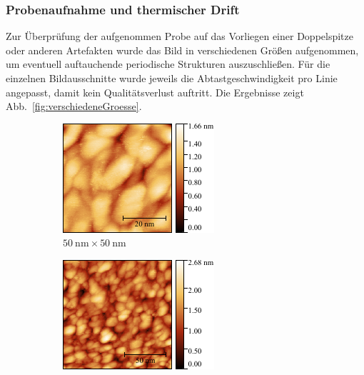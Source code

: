 \documentclass[a4paper,twoside,final]{article}
\begin{document}
\subsubsection{Probenaufnahme und thermischer Drift}\label{sec:thermischerDrift}
Zur Überprüfung der aufgenommen Probe auf das Vorliegen einer Doppelspitze oder anderen Artefakten wurde das Bild in verschiedenen Größen aufgenommen, um eventuell auftauchende periodische Strukturen auszuschließen.
Für die einzelnen Bildausschnitte wurde jeweils die Abtastgeschwindigkeit pro Linie angepasst, damit kein Qualitätsverlust auftritt. Die Ergebnisse zeigt Abb.~\ref{fig:verschiedeneGroesse}.
\begin{figure}[htp]
    \centering
    \begin{subfigure}{0.3\textwidth}
        \includegraphics[width=\textwidth]{Bilder/Image01989_50nm.pdf}
        \caption{$\SI{50}{\nano\metre}\times\SI{50}{\nano\metre}$}
    \end{subfigure}
    \hspace{0.5cm}
    \begin{subfigure}{0.3\textwidth}
        \includegraphics[width=\textwidth]{Bilder/Image01985_130nm.pdf}

\end{subfigure}
\end{figure}
\end{document}
